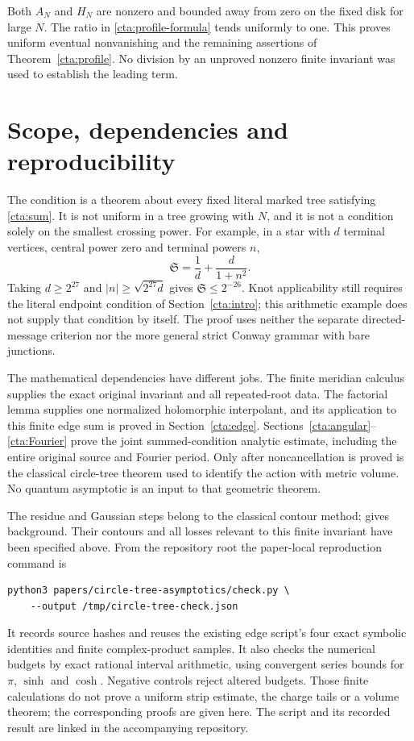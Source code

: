 Both \(A_N\) and \(H_N\) are nonzero and bounded away from
zero on the fixed disk for large \(N\).
The ratio in \eqref{cta:profile-formula} tends uniformly
to one. This proves uniform eventual nonvanishing and
the remaining assertions of Theorem~\ref{cta:profile}.
No division by an unproved nonzero finite invariant was
used to establish the leading term.

\section{Scope, dependencies and reproducibility}

The condition is a theorem about every fixed literal marked
tree satisfying \eqref{cta:sum}. It is not uniform in a tree
growing with \(N\), and it is not a condition solely on the
smallest crossing power. For example, in a star with \(d\)
terminal vertices, central power zero and terminal powers \(n\),
\[
 \mathfrak S=\frac1d+\frac{d}{1+n^2}.
\]
Taking \(d\ge2^{27}\) and \(|n|\ge\sqrt{2^{27}d}\) gives
\(\mathfrak S\le2^{-26}\). Knot applicability still requires
the literal endpoint condition of Section~\ref{cta:intro};
this arithmetic example does not supply that condition by itself.
The proof uses neither the separate directed-message criterion
nor the more general strict Conway grammar with bare junctions.

The mathematical dependencies have different jobs.
The finite meridian calculus supplies the exact original
invariant and all repeated-root data.
The factorial lemma supplies one normalized holomorphic
interpolant, and its application to this finite edge sum is
proved in Section~\ref{cta:edge}.
Sections~\ref{cta:angular}--\ref{cta:Fourier} prove the joint
summed-condition analytic estimate, including the entire
original source and Fourier period.
Only after noncancellation is proved is the classical
circle-tree theorem used to identify the action with metric
volume. No quantum asymptotic is an input to that geometric
theorem.

The residue and Gaussian steps belong to the classical
contour method; \cite[Sections~2.4(iii)--(iv)]{DLMF} gives
background. Their contours and all losses relevant to this
finite invariant have been specified above.
From the repository root the paper-local reproduction command is
\begin{verbatim}
python3 papers/circle-tree-asymptotics/check.py \
    --output /tmp/circle-tree-check.json
\end{verbatim}
It records source hashes and reuses the existing edge script's four
exact symbolic identities and finite complex-product samples.
It also checks the numerical budgets by exact rational interval
arithmetic, using convergent series bounds for \(\pi\), \(\sinh\)
and \(\cosh\). Negative controls reject altered budgets.
Those finite calculations do not prove a uniform strip estimate,
the charge tails or a volume theorem; the corresponding
proofs are given here. The script and its recorded result are
linked in the accompanying repository.

